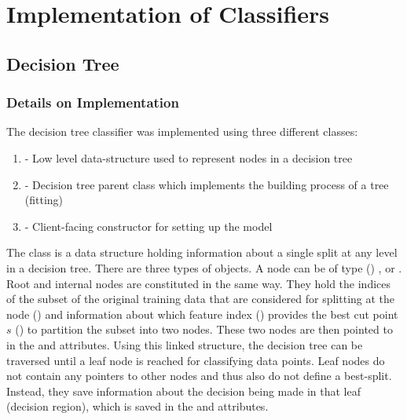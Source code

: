 
\section{Implementation of Classifiers}


\subsection{Decision Tree}
\subsubsection{Details on Implementation}

The decision tree classifier was implemented using three different classes:


\begin{enumerate}
    \item {} - Low level data-structure used to represent nodes in a decision tree
    
    \item {} - Decision tree parent class which implements the building process of a tree (fitting) 
    
    \item {} - Client-facing constructor for setting up the model
\end{enumerate}
\vspace{10pt}

The  class is a data structure holding information about a single split at any level in a decision tree. There are three types of  objects. 
A node can be of type () ,  or . Root and internal nodes are constituted in the same way. They hold the indices of the subset of the original training data that are considered for splitting at the node () and information about which feature index () provides the best cut point $s$ () to partition the subset into two nodes. These two nodes are then pointed to in the  and  attributes. Using this linked structure, the decision tree can be traversed until a leaf node is reached for classifying data points.
Leaf nodes do not contain any pointers to other nodes and thus also do not define a best-split. Instead, they save information about the decision being made in that leaf (decision region), which is saved in the  and  attributes. 
\newline

